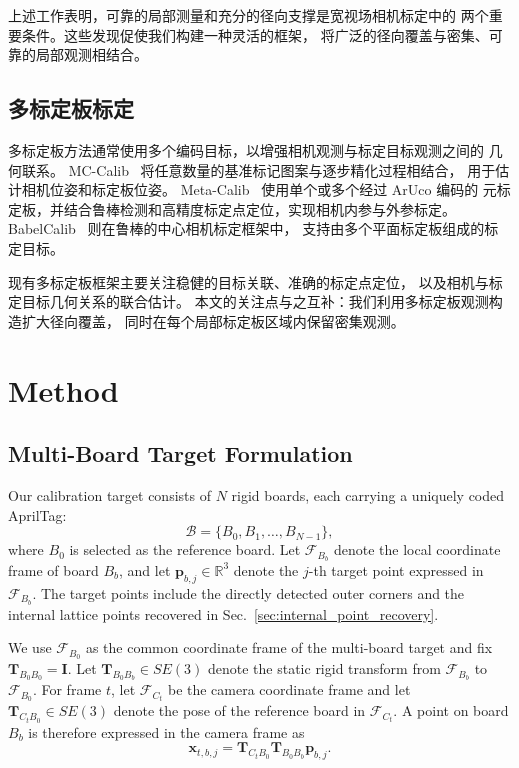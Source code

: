 \documentclass[letterpaper, 10 pt, conference]{ieeeconf}  %
\begin{document}
上述工作表明，可靠的局部测量和充分的径向支撑是宽视场相机标定中的
两个重要条件。这些发现促使我们构建一种灵活的框架，
将广泛的径向覆盖与密集、可靠的局部观测相结合。

\subsection{多标定板标定}

多标定板方法通常使用多个编码目标，以增强相机观测与标定目标观测之间的
几何联系。
MC-Calib~\cite{rameau2022mc} 将任意数量的基准标记图案与逐步精化过程相结合，
用于估计相机位姿和标定板位姿。
Meta-Calib~\cite{zhou2024meta} 使用单个或多个经过 ArUco 编码的
元标定板，并结合鲁棒检测和高精度标定点定位，实现相机内参与外参标定。
BabelCalib~\cite{lochman2021babelcalib} 则在鲁棒的中心相机标定框架中，
支持由多个平面标定板组成的标定目标。

现有多标定板框架主要关注稳健的目标关联、准确的标定点定位，
以及相机与标定目标几何关系的联合估计。
本文的关注点与之互补：我们利用多标定板观测构造扩大径向覆盖，
同时在每个局部标定板区域内保留密集观测。

\section{Method}

\subsection{Multi-Board Target Formulation}

Our calibration target consists of $N$ rigid boards, each carrying a
uniquely coded AprilTag:
\begin{equation}
\mathcal{B}=\{B_0,B_1,\ldots,B_{N-1}\},
\end{equation}
where $B_0$ is selected as the reference board. Let
$\mathcal{F}_{B_b}$ denote the local coordinate frame of board $B_b$,
and let $\mathbf{p}_{b,j}\in\mathbb{R}^3$ denote the $j$-th target point
expressed in $\mathcal{F}_{B_b}$. The target points include the directly
detected outer corners and the internal lattice points recovered in
Sec.~\ref{sec:internal_point_recovery}.

We use $\mathcal{F}_{B_0}$ as the common coordinate frame of the
multi-board target and fix
$\mathbf{T}_{B_0B_0}=\mathbf{I}$.
Let $\mathbf{T}_{B_0B_b}\in SE(3)$ denote the static rigid transform
from $\mathcal{F}_{B_b}$ to $\mathcal{F}_{B_0}$. For frame $t$, let
$\mathcal{F}_{C_t}$ be the camera coordinate frame and let
$\mathbf{T}_{C_tB_0}\in SE(3)$ denote the pose of the reference board
in $\mathcal{F}_{C_t}$. A point on board $B_b$ is therefore
expressed in the camera frame as
\begin{equation}
\mathbf{x}_{t,b,j}
=
\mathbf{T}_{C_tB_0}
\mathbf{T}_{B_0B_b}
\mathbf{p}_{b,j}.
\end{equation}
\end{document}
